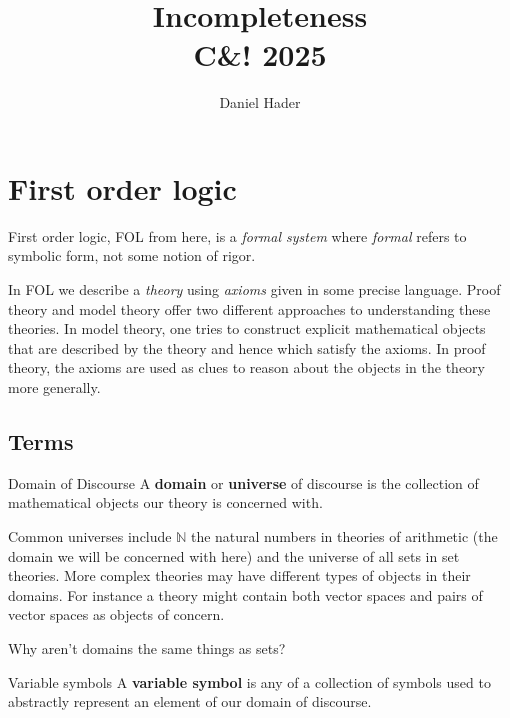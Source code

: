 \documentclass[10pt]{article}
\title{Incompleteness\\\large C\&! 2025}
\author{Daniel Hader}
\date{}
\newcommand{\N}{\mathbb{N}}
\begin{document}
	\maketitle
	
	\section{First order logic}
	
	
	First order logic, FOL from here, is a \emph{formal system} where \emph{formal} refers to symbolic form, not some notion of rigor.
	
	In FOL we describe a \emph{theory} using \emph{axioms} given in some precise language. Proof theory and model theory offer two different approaches to understanding these theories. In model theory, one tries to construct explicit mathematical objects that are described by the theory and hence which satisfy the axioms. In proof theory, the axioms are used as clues to reason about the objects in the theory more generally. 
	
	
	\subsection{Terms}
	
	\begin{definition}{Domain of Discourse}{}
		A {\bf domain} or {\bf universe} of discourse is the collection of mathematical objects our theory is concerned with.
	\end{definition}
	
	\noindent
	Common universes include $\N$ the natural numbers in theories of arithmetic (the domain we will be concerned with here) and the universe of all sets in set theories.
	More complex theories may have different types of objects in their domains.
	For instance a theory might contain both vector spaces and pairs of vector spaces as objects of concern.
	
	\begin{tcolorbox}[colback=red!5!white,colframe=red!75!black,title={\bf Hope someone asks about it}]
		Why aren't domains the same things as sets?
	\end{tcolorbox}
	
	
	\begin{definition}{Variable symbols}{}
		A {\bf variable symbol} is any of a collection of symbols used to abstractly represent an element of our domain of discourse.
	\end{definition}
	
\end{document}
